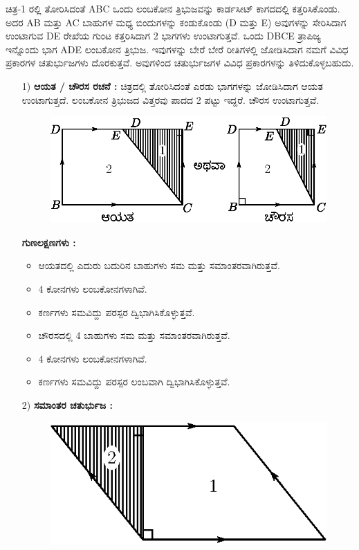  ಚಿತ್ರ-1 ರಲ್ಲಿ ತೋರಿಸಿದಂತೆ ABC ಒಂದು ಲಂಬಕೋನ ತ್ರಿಭುಜವನ್ನು ಕಾರ್ಡಸೀಟ್ ಕಾಗದದಲ್ಲಿ ಕತ್ತರಿಸಿಕೊಂಡು. ಅದರ AB ಮತ್ತು AC ಬಾಹುಗಳ ಮಧ್ಯ ಬಿಂದುಗಳನ್ನು ಕಂಡುಕೊಂಡು (D ಮತ್ತು E) ಅವುಗಳನ್ನು ಸೇರಿಸಿದಾಗ ಉಂಟಾಗುವ DE ರೇಖೆಯ ಗುಂಟ ಕತ್ತರಿಸಿದಾಗ 2 ಭಾಗಗಳು ಉಂಟಾಗುತ್ತವೆ. ಒಂದು DBCE ತ್ರಾಪಿಜ್ಯ ಇನ್ನೊಂದು ಭಾಗ  ADE ಲಂಬಕೋನ ತ್ರಿಭುಜ. ಇವುಗಳನ್ನು ಬೇರೆ ಬೇರೆ ರೀತಿಗಳಲ್ಲಿ ಜೋಡಿಸಿದಾಗ ನಮಗೆ ವಿವಿಧ ಪ್ರಕಾರಗಳ ಚತುರ್ಭುಜಗಳು ದೊರಕುತ್ತವೆ. ಅವುಗಳಿಂದ ಚತುರ್ಭುಜಗಳ ವಿವಿಧ ಪ್ರಕಾರಗಳನ್ನು ತಿಳಿದುಕೊಳ್ಳಬಹುದು. 
 \begin{enumerate}
 \item[1)] \textbf{ಆಯತ / ಚೌರಸ ರಚನೆ :} ಚಿತ್ರದಲ್ಲಿ ತೋರಿಸಿದಂತೆ ಎರಡು ಭಾಗಗಳನ್ನು ಜೋಡಿಸಿದಾಗ ಆಯತ ಉಂಟಾಗುತ್ತದೆ. ಲಂಬಕೋನ ತ್ರಿಭುಜದ ವಿತ್ತರವು  ಪಾದದ 2 ಪಟ್ಟು ಇದ್ದರೆ. ಚೌರಸ ಉಂಟಾಗುತ್ತವೆ. 
 \begin{figure}[H]
\centering
\includegraphics[scale=.98]{src/figure/chap1/fig1-40b.eps}
\end{figure}

\medskip 
 \textbf{ಗುಣಲಕ್ಷಣಗಳು :}
 \begin{itemize}
 \item ಆಯತದಲ್ಲಿ ಎದುರು ಬದುರಿನ ಬಾಹುಗಳು ಸಮ ಮತ್ತು ಸಮಾಂತರವಾಗಿರುತ್ತವೆ. 
 
 \item 4 ಕೋನಗಳು ಲಂಬಕೋನಗಳಾಗಿವೆ. 
 
 \item ಕರ್ಣಗಳು ಸಮವಿದ್ದು ಪರಸ್ಪರ ದ್ವಿಭಾಗಿಸಿಕೊಳ್ಳುತ್ತವೆ. 
 
 \item ಚೌರಸದಲ್ಲಿ 4 ಬಾಹುಗಳು ಸಮ ಮತ್ತು ಸಮಾಂತರವಾಗಿರುತ್ತವೆ. 
 
 \item 4 ಕೋನಗಳು ಲಂಬಕೋನಗಳಾಗಿವೆ. 
 
 \item ಕರ್ಣಗಳು ಸಮವಿದ್ದು ಪರಸ್ಪರ ಲಂಬವಾಗಿ ದ್ವಿಭಾಗಿಸಿಕೊಳ್ಳುತ್ತವೆ. 
 \end{itemize}
 
  \item[2)] \textbf{ಸಮಾಂತರ ಚತುರ್ಭುಜ :}
  \begin{figure}[H]
\centering
\includegraphics[scale=.98]{src/figure/chap1/fig1-41a.eps}
\end{figure}


\end{enumerate}
